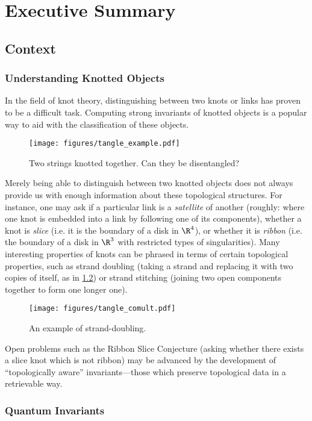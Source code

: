 \chapter{Executive Summary}
\label{ch:summary}

\section{Context}
\subsection{Understanding Knotted Objects}
In the field of knot theory, distinguishing between two knots or links
has proven to be a difficult task. Computing strong invariants of knotted
objects is a popular way to aid with the classification of these objects.
\begin{figure}[h]
        \centering
        \texttt{[image: figures/tangle\_example.pdf]}
        \caption{Two strings knotted together. Can they be disentangled?}
        \label{fig:unknot}
\end{figure}

Merely being able to distinguish between two knotted objects does not always
provide us with enough information about these topological structures. For
instance, one may ask if a particular link is a \emph{satellite} of another
(roughly: where one knot is embedded into a link by following one of its
components), whether a knot is \emph{slice} (i.e. it is the boundary of a disk in
$\R^4$), or whether it is \emph{ribbon} (i.e. the boundary of a disk in $\R^3$
with restricted types of singularities). Many interesting properties of knots
can be phrased in terms of certain topological properties, such as strand
doubling (taking a strand and replacing it with two copies of itself, as in
\cref{fig:strand_double}) or strand stitching (joining two open components
together to form one longer one).
\begin{figure}[h]
        \centering
        \texttt{[image: figures/tangle\_comult.pdf]}
        \caption{An example of strand-doubling.}
        \label{fig:strand_double}
\end{figure}

Open problems such as the Ribbon Slice Conjecture (asking whether there exists a
slice knot which is not ribbon) may be advanced by the development of
\enquote{topologically aware} invariants---those which preserve topological data
in a retrievable way.

\subsection{Quantum Invariants}

